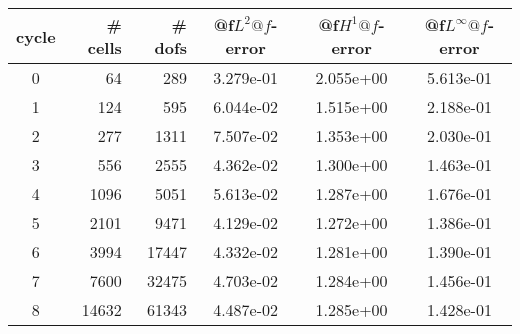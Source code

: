 \documentclass[10pt]{report}
\begin{document}
\begin{table}[H]
\begin{center}
\begin{tabular}{|c|r|r|c|c|c|} \hline
cycle & \# cells & \# dofs & @f$L^2@f$-error & @f$H^1@f$-error & @f$L^\infty@f$-error\\ \hline
0 & 64 & 289 & 3.279e-01 & 2.055e+00 & 5.613e-01\\ \hline
1 & 124 & 595 & 6.044e-02 & 1.515e+00 & 2.188e-01\\ \hline
2 & 277 & 1311 & 7.507e-02 & 1.353e+00 & 2.030e-01\\ \hline
3 & 556 & 2555 & 4.362e-02 & 1.300e+00 & 1.463e-01\\ \hline
4 & 1096 & 5051 & 5.613e-02 & 1.287e+00 & 1.676e-01\\ \hline
5 & 2101 & 9471 & 4.129e-02 & 1.272e+00 & 1.386e-01\\ \hline
6 & 3994 & 17447 & 4.332e-02 & 1.281e+00 & 1.390e-01\\ \hline
7 & 7600 & 32475 & 4.703e-02 & 1.284e+00 & 1.456e-01\\ \hline
8 & 14632 & 61343 & 4.487e-02 & 1.285e+00 & 1.428e-01\\ \hline
\end{tabular}
\end{center}
\end{table}
\end{document}
